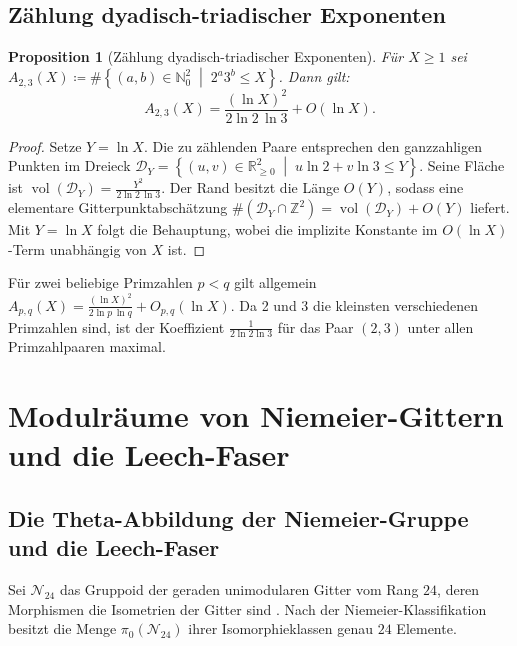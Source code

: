 \documentclass[11pt,a4paper]{article}
\newtheorem{proposition}[theorem]{Proposition}
\begin{document}
	\subsection{Zählung dyadisch-triadischer Exponenten}
	
	\begin{proposition}[Zählung dyadisch-triadischer Exponenten]
		Für $X \ge 1$ sei $A_{2,3}(X) \coloneqq \#\left\{ (a,b)\in\mathbb{N}_0^2 \;\middle|\; 2^a3^b \le X \right\}$. Dann gilt:
		\begin{equation}
			A_{2,3}(X) = \frac{(\ln X)^2}{2\ln 2\,\ln 3} + O(\ln X).
		\end{equation}
	\end{proposition}
	
	\begin{proof}
		Setze $Y = \ln X$. Die zu zählenden Paare entsprechen den ganzzahligen Punkten im Dreieck
		$\mathcal{D}_Y = \left\{ (u,v)\in\mathbb{R}_{\ge 0}^2 \;\middle|\; u\ln 2 + v\ln 3 \le Y \right\}$.
		Seine Fläche ist $\operatorname{vol}(\mathcal{D}_Y) = \frac{Y^2}{2\ln 2\,\ln 3}$. Der Rand besitzt die Länge $O(Y)$, sodass eine elementare Gitterpunktabschätzung $\#(\mathcal{D}_Y \cap \mathbb{Z}^2) = \operatorname{vol}(\mathcal{D}_Y) + O(Y)$ liefert. Mit $Y=\ln X$ folgt die Behauptung, wobei die implizite Konstante im $O(\ln X)$-Term unabhängig von $X$ ist.
	\end{proof}
	
	Für zwei beliebige Primzahlen $p < q$ gilt allgemein $A_{p,q}(X) = \frac{(\ln X)^2}{2\ln p\,\ln q} + O_{p,q}(\ln X)$. Da 2 und 3 die kleinsten verschiedenen Primzahlen sind, ist der Koeffizient $\frac{1}{2\ln 2\ln 3}$ für das Paar $(2,3)$ unter allen Primzahlpaaren maximal.
	
	\section{Modulräume von Niemeier-Gittern und die Leech-Faser}
	
	\subsection{Die Theta-Abbildung der Niemeier-Gruppe und die Leech-Faser}
	
	Sei $\mathscr{N}_{24}$ das Gruppoid der geraden unimodularen Gitter vom Rang $24$, deren Morphismen die Isometrien der Gitter sind \cite{ebeling}. Nach der Niemeier-Klassifikation \cite{niemeier} besitzt die Menge $\pi_0(\mathscr{N}_{24})$ ihrer Isomorphieklassen genau $24$ Elemente.
	
\end{document}
